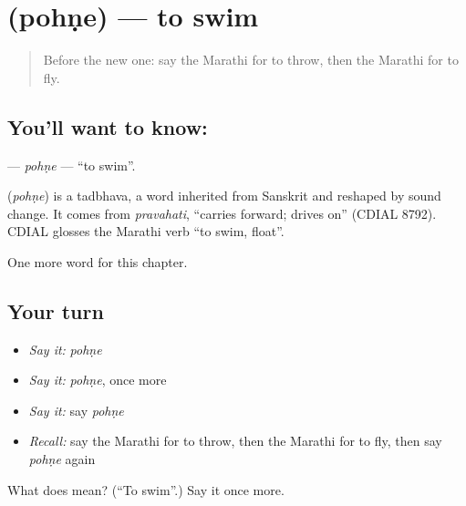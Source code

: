 \section[\texorpdfstring{\mr{पोहणे} (pohṇe)}{पोहणे (pohṇe)}]{ (pohṇe) — to swim}

\label{lesson:MR-C82-pohne}



\begin{quote}
Before the new one: say the Marathi for to throw, then the Marathi for to fly.
\end{quote}

\subsection*{You'll want to know: }
\textbf{} — \emph{pohṇe} — \textquotedblleft{}to swim\textquotedblright{}.

\begin{cousinweb}
\textbf{} (\emph{pohṇe}) is a tadbhava, a word inherited from Sanskrit and reshaped by sound change. It comes from \emph{pravahati}, \textquotedblleft{}carries forward; drives on\textquotedblright{} (CDIAL 8792). CDIAL glosses the Marathi verb \textquotedblleft{}to swim, float\textquotedblright{}.
\end{cousinweb}

\begin{grammarlens}[title={What you've built}]
One more word for this chapter.
\end{grammarlens}

\subsection*{Your turn}
\begin{itemize}
\raggedright
  \item \emph{Say it:} \emph{pohṇe}
  \item \emph{Say it:} \emph{pohṇe}, once more
  \item \emph{Say it:} say \emph{pohṇe}
  \item \emph{Recall:} say the Marathi for to throw, then the Marathi for to fly, then say \emph{pohṇe} again
\end{itemize}

\begin{tcolorbox}[breakable,colback=teal!4,colframe=teal!35!black,title={Before you move on}]
What does  mean? (\textquotedblleft{}To swim\textquotedblright{}.) Say it once more.
\end{tcolorbox}
